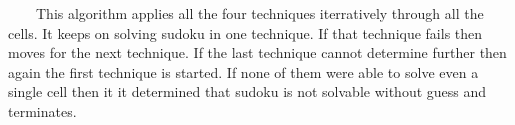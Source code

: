 \documentclass[12pt,a4paper]{article}
\begin{document}
\begin{flushleft}
\verb%SolveSudoku()%
\\* \verb%{ do%
\\* \verb%  {   do%
\\* \verb%      {      n=0%
\\* \verb%             n=BasicFilling()%
\\* \verb%      }while(n>0)    %
\\* \verb%      do%
\\* \verb%      {      m=0%
\\* \verb%             m=FillByElimination()%
\\* \verb%      }while(m>0)    %
\\* \verb%      do{    o=0%
\\* \verb%             o=RowAndColumnAnalysis()%
\\* \verb%      }while(o>0)    %
\\* \verb%      if(n=0 AND m=0 AND o=0 ) then%
\\* \verb%      {      print("Sudoku Cannot be solved Without Guess")%
\\* \verb%             return 0%
\\* \verb%      }%
\\* \verb%  } while ( Sudoku not solved )%
\\* \verb%  return 1%
\\* \verb%}%
\end{flushleft}
\ \ \ \ This algorithm applies all the four techniques iterratively through all the cells. It keeps on solving sudoku in one technique. If that technique fails then moves for the next technique. If the last technique cannot determine further then again the first technique is started. If none of them were able to solve even a single cell then it it determined that sudoku is not solvable without guess and terminates.
\end{document}
